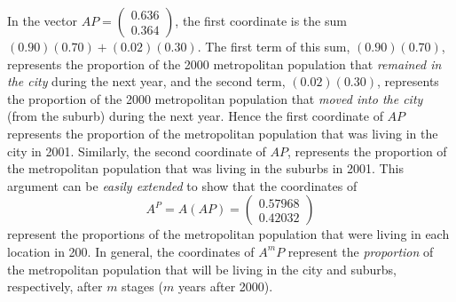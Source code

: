 In the vector \(AP = \begin{pmatrix} 0.636 \\ 0.364 \end{pmatrix}\), the first coordinate is the sum \((0.90)(0.70) + (0.02)(0.30)\).
The first term of this sum, \((0.90)(0.70)\), represents the proportion of the 2000 metropolitan population that \emph{remained in the city} during the next year,
and the second term, \((0.02)(0.30)\), represents the proportion of the 2000 metropolitan population that \emph{moved into the city} (from the suburb) during the next year.
Hence the first coordinate of \(AP\) represents the proportion of the metropolitan population that was living in the city in 2001.
Similarly, the second coordinate of \(AP\), represents the proportion of the metropolitan population that was living in the suburbs in 2001.
This argument can be \emph{easily extended} to show that the coordinates of
\[
    A^P = A(AP) = \begin{pmatrix} 0.57968 \\ 0.42032 \end{pmatrix}
\]
represent the proportions of the metropolitan population that were living in each location in 200.
In general, the coordinates of \(A^m P\) represent the \emph{proportion} of the metropolitan population that will be living in the city and suburbs, respectively, after \(m\) stages (\(m\) years after 2000).

